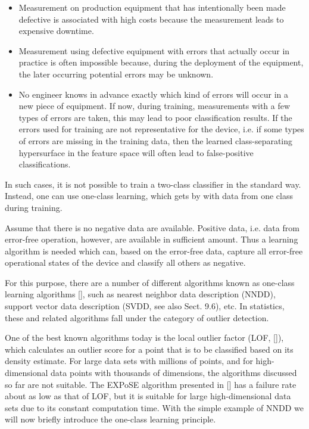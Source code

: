 \documentclass[10pt]{article}
\begin{document}
\begin{itemize}
  \item Measurement on production equipment that has intentionally been made defective is associated with high costs because the measurement leads to expensive downtime.
  \item Measurement using defective equipment with errors that actually occur in practice is often impossible because, during the deployment of the equipment, the later occurring potential errors may be unknown.
  \item No engineer knows in advance exactly which kind of errors will occur in a new piece of equipment. If now, during training, measurements with a few types of errors are taken, this may lead to poor classification results. If the errors used for training are not representative for the device, i.e. if some types of errors are missing in the training data, then the learned class-separating hypersurface in the feature space will often lead to false-positive classifications.
\end{itemize}


In such cases, it is not possible to train a two-class classifier in the standard way. Instead, one can use one-class learning, which gets by with data from one class during training.

Assume that there is no negative data are available. Positive data, i.e. data from error-free operation, however, are available in sufficient amount. Thus a learning algorithm is needed which can, based on the error-free data, capture all error-free operational states of the device and classify all others as negative.

For this purpose, there are a number of different algorithms known as one-class learning algorithms [\cite{tax2001one}], such as nearest neighbor data description (NNDD), support vector data description (SVDD, see also Sect. 9.6), etc. In statistics, these and related algorithms fall under the category of outlier detection.

One of the best known algorithms today is the local outlier factor (LOF, [\cite{breunig2000lof}]), which calculates an outlier score for a point that is to be classified based on its density estimate. For large data sets with millions of points, and for high-dimensional data points with thousands of dimensions, the algorithms discussed so far are not suitable. The EXPoSE algorithm presented in [\cite{schneider2016expected}] has a failure rate about as low as that of LOF, but it is suitable for large high-dimensional data sets due to its constant computation time. With the simple example of NNDD we will now briefly introduce the one-class learning principle.
\end{document}
